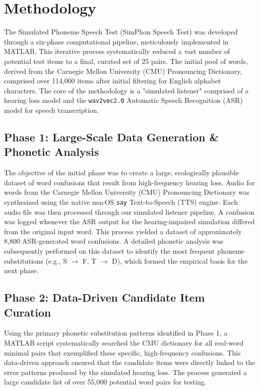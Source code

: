 \documentclass{article}
\begin{document}
\section{Methodology}
The Simulated Phoneme Speech Test (SimPhon Speech Test) was developed through a six-phase computational pipeline, meticulously implemented in MATLAB. This iterative process systematically reduced a vast number of potential test items to a final, curated set of 25 pairs. The initial pool of words, derived from the Carnegie Mellon University (CMU) Pronouncing Dictionary, comprised over 114,000 items after initial filtering for English alphabet characters. The core of the methodology is a "simulated listener" comprised of a hearing loss model and the \texttt{wav2vec2.0} Automatic Speech Recognition (ASR) model for speech transcription.

\subsection{Phase 1: Large-Scale Data Generation \& Phonetic Analysis}
The objective of the initial phase was to create a large, ecologically plausible dataset of word confusions that result from high-frequency hearing loss. Audio for words from the Carnegie Mellon University (CMU) Pronouncing Dictionary was synthesized using the native macOS \texttt{say} Text-to-Speech (TTS) engine. Each audio file was then processed through our simulated listener pipeline. A confusion was logged whenever the ASR output for the hearing-impaired simulation differed from the original input word. This process yielded a dataset of approximately 8,800 ASR-generated word confusions. A detailed phonetic analysis was subsequently performed on this dataset to identify the most frequent phoneme substitutions (e.g., S $\rightarrow$ F, T $\rightarrow$ D), which formed the empirical basis for the next phase.

\subsection{Phase 2: Data-Driven Candidate Item Curation}
Using the primary phonetic substitution patterns identified in Phase 1, a MATLAB script systematically searched the CMU dictionary for all real-word minimal pairs that exemplified these specific, high-frequency confusions. This data-driven approach ensured that the candidate items were directly linked to the error patterns produced by the simulated hearing loss. The process generated a large candidate list of over 55,000 potential word pairs for testing.
\end{document}
